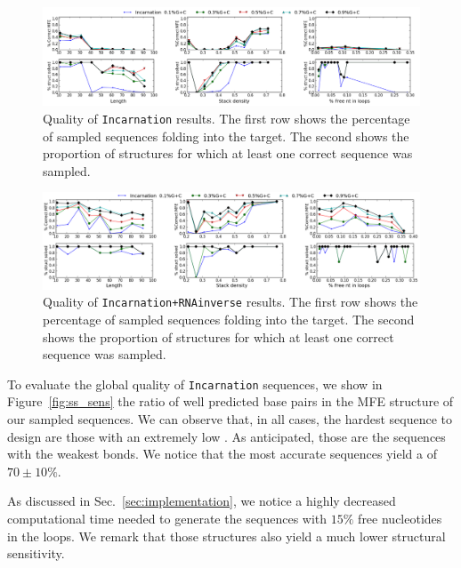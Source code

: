 \begin{figure}[ht!]	
	\centering
	\includegraphics[width=\textwidth]{Figures/mfe_struct_solve_nornainverse.png}
	\caption{Quality of \texttt{Incarnation} results. The first row shows the percentage
	of sampled sequences folding into the target. The second shows the 	
	proportion	of structures for which at least one correct sequence was 
	sampled.}
	\label{fig:mfe_struct_solved_noinverse}	
\end{figure}



\begin{figure}[ht!]	
	\centering
	\includegraphics[width=\textwidth]{Figures/mfe_struct_solved}
	\caption{Quality of \texttt{Incarnation+RNAinverse} results. The first row shows the percentage
	of sampled sequences folding into the target. The second shows the 	
	proportion	of structures for which at least one correct sequence was 
	sampled.}
	\label{fig:mfe_struct_solved}	
\end{figure}
 
To evaluate the global quality of \texttt{Incarnation} sequences, we show
in Figure~\ref{fig:ss_sens} the ratio of well predicted base pairs in the
MFE structure of our sampled sequences. We can observe that, in all cases,
the hardest sequence to design are those with an extremely low \GCContent. As anticipated, those are the sequences with the weakest bonds.
We notice that the most accurate sequences yield a \GCContent
of $70\pm 10\%$. 

As discussed in Sec.~\ref{sec:implementation}, we notice a highly decreased
computational time needed to generate the sequences with $15\%$ free 
nucleotides in the loops. We remark that those structures also yield 
a much lower structural sensitivity.

